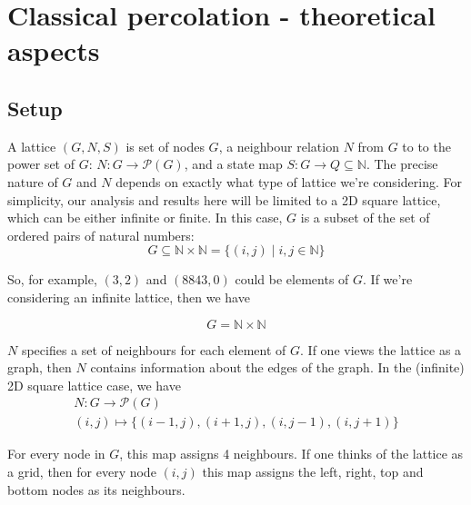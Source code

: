 \chapter{Classical percolation - theoretical aspects}

\label{ch:theoreticalaspects} %



\section{Setup}

A lattice $(G, N, S)$ is set of nodes $G$, a neighbour relation $N$ from $G$ to to the power set of $G$: $N \colon G \to \mathcal{P}(G)$, and a state map $S \colon G \to Q \subseteq \mathbb{N}$. The precise nature of $G$ and $N$ depends on exactly what type of lattice we're considering. For simplicity, our analysis and results here will be limited to a 2D square lattice, which can be either infinite or finite.
In this case, $G$ is a subset of the set of ordered pairs of natural numbers: 
\begin{equation}
    G \subseteq \mathbb{N} \times \mathbb{N} = \{(i, j) \mid i, j \in \mathbb{N}\}
\end{equation}

So, for example, $(3, 2)$ and $(8843, 0)$ could be elements of $G$.
If we're considering an infinite lattice, then we have 

$$ 
G = \mathbb{N} \times \mathbb{N}
$$ 

$N$ specifies a set of neighbours for each element of $G$. If one views the lattice as a graph, then $N$ contains information about the edges of the graph. In the (infinite) 2D square lattice case, we have 
\begin{equation}
\begin{gathered}
N \colon G \to \mathcal{P}(G) \\
(i, j) \mapsto \{ (i-1, j), (i+1, j), (i, j-1), (i, j+1) \} 
\end{gathered}
\end{equation}

For every node in $G$, this map assigns 4 neighbours. If one thinks of the lattice as a grid, then for every node $(i, j)$ this map assigns the left, right, top and bottom nodes as its neighbours.

